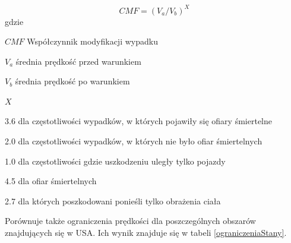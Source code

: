 \begin{equation}
CMF = (V_a / V_b)^X
\end{equation}
gdzie
\begin{eqwhere}[2cm]
	\item[$CMF$] Współczynnik modyfikacji wypadku
	\item[$V_a$] średnia prędkość przed warunkiem
	\item[$V_b$] średnia prędkość po warunkiem
	\item[$X$] \begin{itemize}
		3.6 dla częstotliwości wypadków, w których pojawiły się ofiary śmiertelne

		2.0 dla częstotliwości wypadków, w których nie było ofiar śmiertelnych

		1.0 dla częstotliwości gdzie uszkodzeniu uległy tylko pojazdy

		4.5 dla ofiar śmiertelnych

		2.7 dla których poszkodowani ponieśli tylko obrażenia ciała
	\end{itemize}

\end{eqwhere}
Porównuje także ograniczenia prędkości dla poszczególnych obszarów znajdujących się w USA. Ich wynik znajduje się w tabeli \ref{ograniczeniaStany}.

